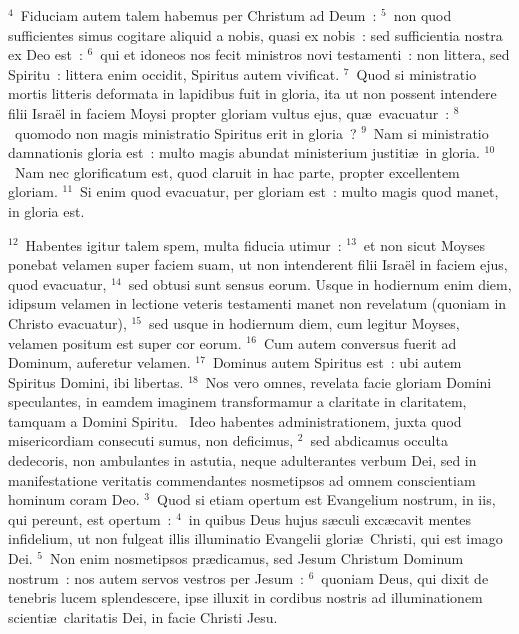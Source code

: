 ${}^{4}$~Fiduciam autem talem habemus per Christum ad Deum~:
${}^{5}$~non quod sufficientes simus cogitare aliquid a nobis, quasi ex nobis~: sed sufficientia nostra ex Deo est~:
${}^{6}$~qui et idoneos nos fecit ministros novi testamenti~: non littera, sed Spiritu~: littera enim occidit, Spiritus autem vivificat.
${}^{7}$~Quod si ministratio mortis litteris deformata in lapidibus fuit in gloria, ita ut non possent intendere filii Isra\"el in faciem Moysi propter gloriam vultus ejus, qu\ae\ evacuatur~:
${}^{8}$~quomodo non magis ministratio Spiritus erit in gloria~?
${}^{9}$~Nam si ministratio damnationis gloria est~: multo magis abundat ministerium justiti\ae\ in gloria.
${}^{10}$~Nam nec glorificatum est, quod claruit in hac parte, propter excellentem gloriam.
${}^{11}$~Si enim quod evacuatur, per gloriam est~: multo magis quod manet, in gloria est.


${}^{12}$~Habentes igitur talem spem, multa fiducia utimur~:
${}^{13}$~et non sicut Moyses ponebat velamen super faciem suam, ut non intenderent filii Isra\"el in faciem ejus, quod evacuatur,
${}^{14}$~sed obtusi sunt sensus eorum. Usque in hodiernum enim diem, idipsum velamen in lectione veteris testamenti manet non revelatum (quoniam in Christo evacuatur),
${}^{15}$~sed usque in hodiernum diem, cum legitur Moyses, velamen positum est super cor eorum.
${}^{16}$~Cum autem conversus fuerit ad Dominum, auferetur velamen.
${}^{17}$~Dominus autem Spiritus est~: ubi autem Spiritus Domini, ibi libertas.
${}^{18}$~Nos vero omnes, revelata facie gloriam Domini speculantes, in eamdem imaginem transformamur a claritate in claritatem, tamquam a Domini Spiritu.
~\lettrine[lines=10,image=true,loversize=0.05,lraise=-0.03]{I}{}deo habentes administrationem, juxta quod misericordiam consecuti sumus, non deficimus,
${}^{2}$~sed abdicamus occulta dedecoris, non ambulantes in astutia, neque adulterantes verbum Dei, sed in manifestatione veritatis commendantes nosmetipsos ad omnem conscientiam hominum coram Deo.
${}^{3}$~Quod si etiam opertum est Evangelium nostrum, in iis, qui pereunt, est opertum~:
${}^{4}$~in quibus Deus hujus s\ae culi exc\ae cavit mentes infidelium, ut non fulgeat illis illuminatio Evangelii glori\ae\ Christi, qui est imago Dei.
${}^{5}$~Non enim nosmetipsos pr\ae dicamus, sed Jesum Christum Dominum nostrum~: nos autem servos vestros per Jesum~:
${}^{6}$~quoniam Deus, qui dixit de tenebris lucem splendescere, ipse illuxit in cordibus nostris ad illuminationem scienti\ae\ claritatis Dei, in facie Christi Jesu.


